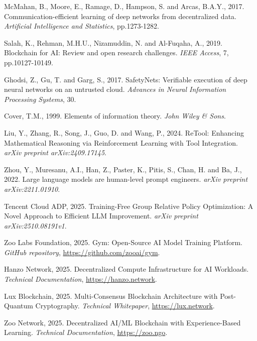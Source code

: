 \documentclass[11pt,a4paper]{article}
\begin{document}
\begin{thebibliography}{99}
McMahan, B., Moore, E., Ramage, D., Hampson, S. and Arcas, B.A.Y., 2017. Communication-efficient learning of deep networks from decentralized data. \textit{Artificial Intelligence and Statistics}, pp.1273-1282.

Salah, K., Rehman, M.H.U., Nizamuddin, N. and Al-Fuqaha, A., 2019. Blockchain for AI: Review and open research challenges. \textit{IEEE Access}, 7, pp.10127-10149.

Ghodsi, Z., Gu, T. and Garg, S., 2017. SafetyNets: Verifiable execution of deep neural networks on an untrusted cloud. \textit{Advances in Neural Information Processing Systems}, 30.

Cover, T.M., 1999. Elements of information theory. \textit{John Wiley \& Sons}.

Liu, Y., Zhang, R., Song, J., Guo, D. and Wang, P., 2024. ReTool: Enhancing Mathematical Reasoning via Reinforcement Learning with Tool Integration. \textit{arXiv preprint arXiv:2409.17145}.

Zhou, Y., Muresanu, A.I., Han, Z., Paster, K., Pitis, S., Chan, H. and Ba, J., 2022. Large language models are human-level prompt engineers. \textit{arXiv preprint arXiv:2211.01910}.

Tencent Cloud ADP, 2025. Training-Free Group Relative Policy Optimization: A Novel Approach to Efficient LLM Improvement. \textit{arXiv preprint arXiv:2510.08191v1}.

Zoo Labs Foundation, 2025. Gym: Open-Source AI Model Training Platform. \textit{GitHub repository}, \url{https://github.com/zooai/gym}.

Hanzo Network, 2025. Decentralized Compute Infrastructure for AI Workloads. \textit{Technical Documentation}, \url{https://hanzo.network}.

Lux Blockchain, 2025. Multi-Consensus Blockchain Architecture with Post-Quantum Cryptography. \textit{Technical Whitepaper}, \url{https://lux.network}.

Zoo Network, 2025. Decentralized AI/ML Blockchain with Experience-Based Learning. \textit{Technical Documentation}, \url{https://zoo.ngo}.

\end{thebibliography}
\end{document}
